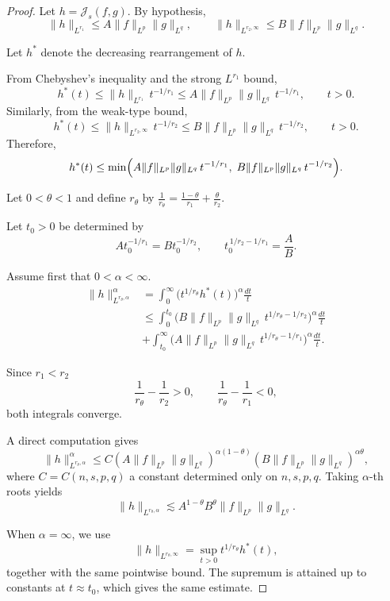 \documentclass[10pt,a4paper]{amsart}
\begin{document}
\begin{proof}
Let $h=\mathcal J_s(f,g)$.
By hypothesis,
\[
\|h\|_{L^{r_1}}
\le A\|f\|_{L^p}\|g\|_{L^q},
\qquad
\|h\|_{L^{r_2,\infty}}
\le B\|f\|_{L^p}\|g\|_{L^q}.
\]

Let $h^*$ denote the decreasing rearrangement of $h$.

From Chebyshev's inequality and the strong $L^{r_1}$ bound,
\[
h^*(t)
\le
\|h\|_{L^{r_1}}\,t^{-1/r_1}
\le
A\|f\|_{L^p}\|g\|_{L^q}\,t^{-1/r_1},
\qquad t>0.
\]
Similarly, from the weak-type bound,
\[
h^*(t)
\le
\|h\|_{L^{r_2,\infty}}\,t^{-1/r_2}
\le
B\|f\|_{L^p}\|g\|_{L^q}\,t^{-1/r_2},
\qquad t>0.
\]
Therefore,
\[
h^*(t)
\le
\min\Bigl(
A\|f\|_{L^p}\|g\|_{L^q}\,t^{-1/r_1},
\;
B\|f\|_{L^p}\|g\|_{L^q}\,t^{-1/r_2}
\Bigr).
\]

Let $0<\theta<1$ and define $r_\theta$ by
$\frac1{r_\theta}
=
\frac{1-\theta}{r_1}
+
\frac{\theta}{r_2}$.


Let $t_0>0$ be determined by
\[
A t_0^{-1/r_1}=B t_0^{-1/r_2},\qquad
t_0^{\,1/r_2-1/r_1}=\frac{A}{B}.
\]

Assume first that $0<\alpha<\infty$.
\begin{align*}
\|h\|_{L^{r_\theta,\alpha}}^\alpha&=
\int_0^\infty
\bigl(t^{1/r_\theta}h^*(t)\bigr)^\alpha
\frac{dt}{t}\\
&\le
\int_0^{t_0}
\bigl(B\|f\|_{L^p}\|g\|_{L^q}\,
t^{1/r_\theta-1/r_2}\bigr)^\alpha
\frac{dt}{t}\\
&+
\int_{t_0}^{\infty}
\bigl(A\|f\|_{L^p}\|g\|_{L^q}\,
t^{1/r_\theta-1/r_1}\bigr)^\alpha
\frac{dt}{t}.
\end{align*}

Since $r_1<r_2$
\[
\frac1{r_\theta}-\frac1{r_2}>0,
\qquad
\frac1{r_\theta}-\frac1{r_1}<0,
\]
both integrals converge.

A direct computation gives
\[
\|h\|_{L^{r_\theta,\alpha}}^\alpha
\le C
(A\|f\|_{L^p}\|g\|_{L^q})^{\alpha(1-\theta)}
(B\|f\|_{L^p}\|g\|_{L^q})^{\alpha\theta},
\]
where $C=C(n,s,p,q)$ a constant determined only on $n,s,p,q$.
Taking $\alpha$-th roots yields
\[
\|h\|_{L^{r_\theta,\alpha}}
\lesssim
A^{1-\theta}B^\theta
\|f\|_{L^p}\|g\|_{L^q}.
\]

When $\alpha=\infty$, we use
\[
\|h\|_{L^{r_\theta,\infty}}
=
\sup_{t>0} t^{1/r_\theta}h^*(t),
\]
together with the same pointwise bound.
The supremum is attained up to constants at $t\approx t_0$,
which gives the same estimate. \end{proof}
\end{document}
